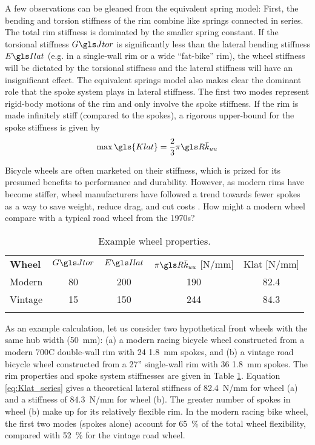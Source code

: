 \documentclass[\rootdir/thesis.tex]{subfiles}
\begin{document}
A few observations can be gleaned from the equivalent spring model: First, the bending and torsion stiffness of the rim combine like springs connected in series. The total rim stiffness is dominated by the smaller spring constant. If the torsional stiffness $\GJ$ is significantly less than the lateral bending stiffness $\EIl$ (e.g. in a single-wall rim or a wide ``fat-bike'' rim), the wheel stiffness will be dictated by the torsional stiffness and the lateral stiffness will have an insignificant effect. The equivalent springs model also makes clear the dominant role that the spoke system plays in lateral stiffness. The first two modes represent rigid-body motions of the rim and only involve the spoke stiffness. If the rim is made infinitely stiff (compared to the spokes), a rigorous upper-bound for the spoke stiffness is given by
\begin{equation}
\label{eq:Klat_stiff_rim}
\max{\gls{Klat}} = \frac{2}{3} \pi \R \kuu
\end{equation}

Bicycle wheels are often marketed on their stiffness, which is prized for its presumed benefits to performance and durability. However, as modern rims have become stiffer, wheel manufacturers have followed a trend towards fewer spokes as a way to save weight, reduce drag, and cut costs \cite{Brown2011}. How might a modern wheel compare with a typical road wheel from the 1970s?

\begin{table}[h]
\caption{Example wheel properties.\label{tab:wheels}}
\begin{tabular}{@{}lcccc}
\hline\noalign{\smallskip}
\bf{Wheel} & $\GJ$ & $\EIl$ & $\pi\R\kuu$ [N/mm] & \gls{Klat} [N/mm]\\
\noalign{\smallskip}\hline\noalign{\smallskip}
Modern  & 80 & 200 & 190 & 82.4\\
Vintage & 15 & 150 & 244 & 84.3\\
\noalign{\smallskip}\hline
\end{tabular}
\end{table}

As an example calculation, let us consider two hypothetical front wheels with the same hub width (\SI{50}{mm}): (a) a modern racing bicycle wheel constructed from a modern 700C double-wall rim with 24 \SI{1.8}{mm} spokes, and (b) a vintage road bicycle wheel constructed from a 27'' single-wall rim with 36 \SI{1.8}{mm} spokes. The rim properties and spoke system stiffnesses are given in Table \ref{tab:wheels}. Equation \eqref{eq:Klat_series} gives a theoretical lateral stiffness of \SI{82.4}{N/mm} for wheel (a) and a stiffness of \SI{84.3}{N/mm} for wheel (b). The greater number of spokes in wheel (b) make up for its relatively flexible rim. In the modern racing bike wheel, the first two modes (spokes alone) account for \SI{65}{\percent} of the total wheel flexibility, compared with \SI{52}{\percent} for the vintage road wheel.
\end{document}
